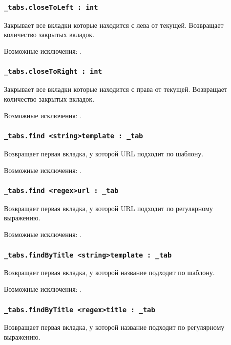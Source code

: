 \subsubsection{\lstinline|_tabs.closeToLeft : int|}

Закрывает все вкладки которые находится с лева от текущей. Возвращает количество закрытых вкладок.

Возможные исключения: .

\subsubsection{\lstinline|_tabs.closeToRight : int|}

Закрывает все вкладки которые находится с права от текущей. Возвращает количество закрытых вкладок.

Возможные исключения: .

\subsubsection{\lstinline|_tabs.find <string>template : _tab|}

Возвращает первая вкладка, у которой URL подходит по шаблону.

Возможные исключения: .

\subsubsection{\lstinline|_tabs.find <regex>url : _tab|}

Возвращает первая вкладка, у которой URL подходит по регулярному выражению.

Возможные исключения: .

\subsubsection{\lstinline|_tabs.findByTitle <string>template : _tab|}

Возвращает первая вкладка, у которой название подходит по шаблону.

Возможные исключения: .

\subsubsection{\lstinline|_tabs.findByTitle <regex>title : _tab|}

Возвращает первая вкладка, у которой название подходит по регулярному выражению.

